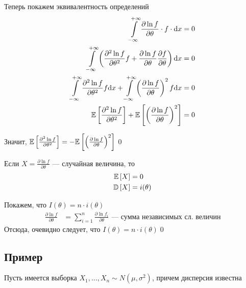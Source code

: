 \documentclass[a4paper, 10pt]{article}
\begin{document}
Теперь покажем эквивалентность определений
\begin{equation*}
    \begin{aligned}
        \int\limits_{-\infty}^{+\infty}\frac{\partial\ln f}{\partial \theta}\cdot f\cdot \text{d}x&=0\\
        \int\limits_{-\infty}^{+\infty}\left(\frac{\partial^2\ln f}{\partial\theta^2}f+\frac{\partial \ln f}{\partial\theta}\frac{\partial f}{\partial\theta}\right)\text{d}x&=0\\
        \int\limits_{-\infty}^{+\infty}\frac{\partial^2\ln f}{\partial\theta^2}f\text{d}x+\int\limits_{-\infty}^{+\infty}\left(\frac{\partial\ln f}{\partial\theta}\right)^2f\text{d}x&=0\\
        \mathbb{E}\left[\frac{\partial^2\ln f}{\partial\theta^2}\right]+\mathbb{E}\left[\left(\frac{\partial\ln f}{\partial\theta}\right)^2\right]&=0
    \end{aligned}
\end{equation*}

Значит, $\mathbb{E}\left[\frac{\partial^2\ln f}{\partial\theta^2}\right]=-\mathbb{E}\left[\left(\frac{\partial\ln f}{\partial\theta}\right)^2\right]$\qed

\comment Если $X=\frac{\partial \ln f}{\partial\theta}$ — случайная величина, то 
\begin{equation*}
    \begin{aligned}
        \mathbb{E}\left[X\right]&=0\\
        \mathbb{D}\left[X\right]&=i(\theta)
    \end{aligned}
\end{equation*}

\proof Покажем, что $I(\theta)=n\cdot i(\theta)$
\begin{equation*}
    \begin{aligned}
        \frac{\partial\ln f}{\partial\theta}&=\sum_{i=1}^{n}\frac{\partial\ln f_i}{\partial\theta}\text{ — сумма независимых сл. величин}
    \end{aligned}
\end{equation*}
Отсюда, очевидно следует, что $I(\theta)=n\cdot i(\theta)$\qed

\subsection{Пример}
Пусть имеется выборка $X_1,\ldots,X_n\sim N(\mu,\sigma^2)$, причем дисперсия известна
\end{document}
